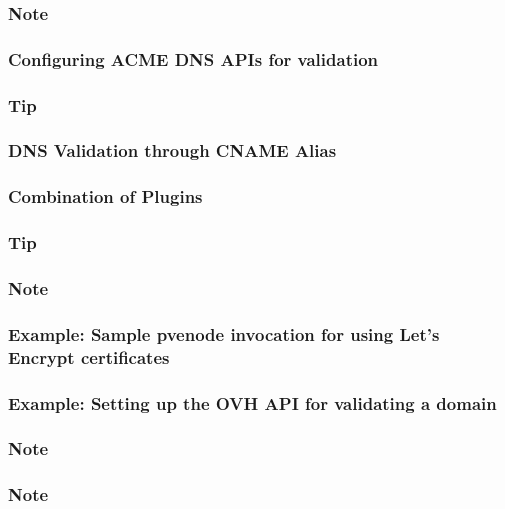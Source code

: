 \subsubsection{Note}

\subsubsection{Configuring ACME DNS APIs for validation}

\subsubsection{Tip}

\subsubsection{DNS Validation through CNAME Alias}

\subsubsection{Combination of Plugins}

\subsubsection{Tip}

\subsubsection{Note}

\subsubsection{Example: Sample pvenode invocation for using Let’s Encrypt certificates}

\subsubsection{Example: Setting up the OVH API for validating a domain}

\subsubsection{Note}

\subsubsection{Note}

